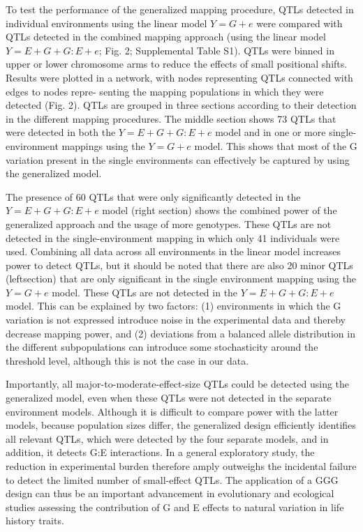 To test the performance of the generalized mapping procedure, QTLs detected in individual environments
using the linear model $Y = G + e$ were compared with QTLs detected in the combined mapping 
approach (using the linear model $Y = E + G + G:E + e$; Fig. 2; Supplemental Table S1).
QTLs were binned in upper or lower chromosome arms to reduce the effects of small positional shifts.
Results were plotted in a network, with nodes representing QTLs connected with edges to nodes repre-
senting the mapping populations in which they were detected (Fig. 2). QTLs are grouped in three sections
according to their detection in the different mapping procedures. The middle section shows 73 QTLs that
were detected in both the $Y = E + G + G:E + e$ model and in one or more single-environment mappings 
using the $Y = G + e$ model. This shows that most of the G variation present in the single environments 
can effectively be captured by using the generalized model.

The presence of 60 QTLs that were only significantly detected in the $Y =E + G + G:E + e$ model 
(right section) shows the combined power of the generalized approach and the usage of more genotypes. 
These QTLs are not detected in the single-environment mapping in which only 41 individuals were used.
Combining all data across all environments in the linear model increases power to detect QTLs, but it
should be noted that there are also 20 minor QTLs (leftsection) that are only significant in the single
environment mapping using the $Y = G + e$ model. These QTLs are not detected in the $ Y = E + G + G:E + e$
model. This can be explained by two factors: (1) environments in which the G variation is not expressed
introduce noise in the experimental data and thereby decrease mapping power, and (2) deviations from a
balanced allele distribution in the different subpopulations can introduce some stochasticity around the
threshold level, although this is not the case in our data.

Importantly, all major-to-moderate-effect-size QTLs could be detected using the generalized model, even
when these QTLs were not detected in the separate environment models. Although it is difficult to 
compare power with the latter models, because population sizes differ, the generalized design 
efficiently identifies all relevant QTLs, which were detected by the four separate models, and in addition, 
it detects G:E interactions. In a general exploratory study, the reduction in experimental burden therefore 
amply outweighs the incidental failure to detect the limited number of small-effect QTLs. The application 
of a GGG design can thus be an important advancement in evolutionary and ecological studies assessing 
the contribution of G and E effects to natural variation in life history traits.

